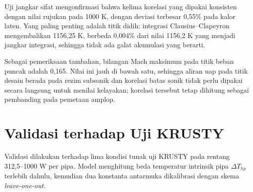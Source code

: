 \documentclass[
  indonesian,
  12pt,
  a4paper,
]{report}
\begin{document}
Uji jangkar sifat mengonfirmasi bahwa kelima korelasi yang dipakai
konsisten dengan nilai rujukan pada 1000 K, dengan deviasi terbesar
0,55\% pada kalor laten. Yang paling penting adalah titik didih:
integrasi Clausius--Clapeyron mengembalikan 1156,25 K, berbeda 0,004\%
dari nilai 1156,2 K yang menjadi jangkar integrasi, sehingga tidak ada
galat akumulasi yang berarti.

Sebagai pemeriksaan tambahan, bilangan Mach maksimum pada titik beban
puncak adalah 0,165. Nilai ini jauh di bawah satu, sehingga aliran uap
pada titik desain berada pada rezim subsonik dan korelasi batas sonik
tidak perlu dipakai secara langsung untuk menilai kelayakan; korelasi
tersebut tetap dihitung sebagai pembanding pada pemetaan amplop.

\section{Validasi terhadap Uji
KRUSTY}\label{validasi-terhadap-uji-krusty}

Validasi dilakukan terhadap lima kondisi tunak uji KRUSTY pada rentang
312,5--1000 W per pipa. Model menghitung beda temperatur intrinsik pipa
\(\Delta T_{hp}\) terlebih dahulu, kemudian dua konstanta antarmuka
dikalibrasi dengan skema \emph{leave-one-out}.
\end{document}
